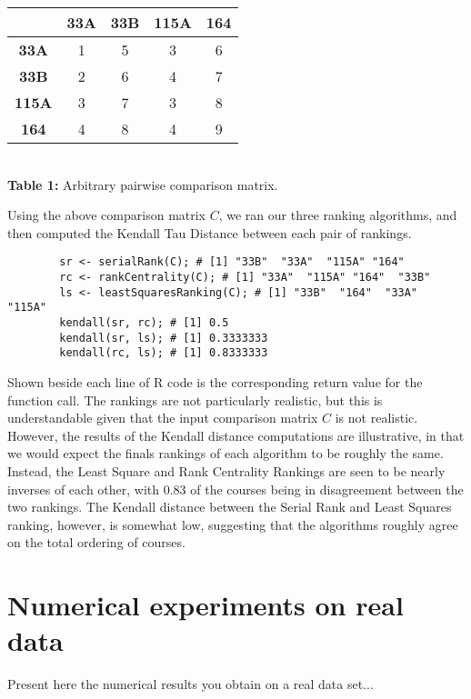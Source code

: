 \documentclass[10pt]{siamltex}
\begin{document}
\begin{pagewiselinenumbers}
\begin{center}
\begin{table}
\end{table}
\begin{tabular}{ c | c | c | c | c}
& \textbf{33A} & \textbf{33B} & \textbf{115A} & \textbf{164}\\\hline
\textbf{33A}    & 1 & 5  & 3 & 6\\
\textbf{33B}    & 2 & 6  & 4 & 7\\
\textbf{115A} &  3 & 7 & 3 & 8\\
\textbf{164}    &  4 & 8 & 4 & 9\\
\end{tabular}
\\\textbf{Table 1:} Arbitrary pairwise comparison matrix. 
\end{center}

Using the above comparison matrix $C$, we ran our three ranking algorithms, and then computed the Kendall Tau Distance between each pair of rankings.\\

\begin{verbatim}
        sr <- serialRank(C); # [1] "33B"  "33A"  "115A" "164" 
        rc <- rankCentrality(C); # [1] "33A"  "115A" "164"  "33B"
        ls <- leastSquaresRanking(C); # [1] "33B"  "164"  "33A"  "115A"
        kendall(sr, rc); # [1] 0.5
        kendall(sr, ls); # [1] 0.3333333
        kendall(rc, ls); # [1] 0.8333333
\end{verbatim}

Shown beside each line of R code is the corresponding return value for the function call. The rankings are not particularly realistic, but this is understandable given that the input comparison matrix $C$ is not realistic. However, the results of the Kendall distance computations are illustrative, in that we would expect the finals rankings of each algorithm to be roughly the same. Instead, the Least Square and Rank Centrality Rankings are seen to be nearly inverses of each other, with 0.83 of the courses being in disagreement between the two rankings. The Kendall distance between the Serial Rank and Least Squares ranking, however, is somewhat low, suggesting that the algorithms roughly agree on the total ordering of courses.

\section{Numerical experiments on real data}   \label{sec:NumExpReal}
Present here the numerical results you obtain on a real data set...


\end{pagewiselinenumbers}
\end{document}
